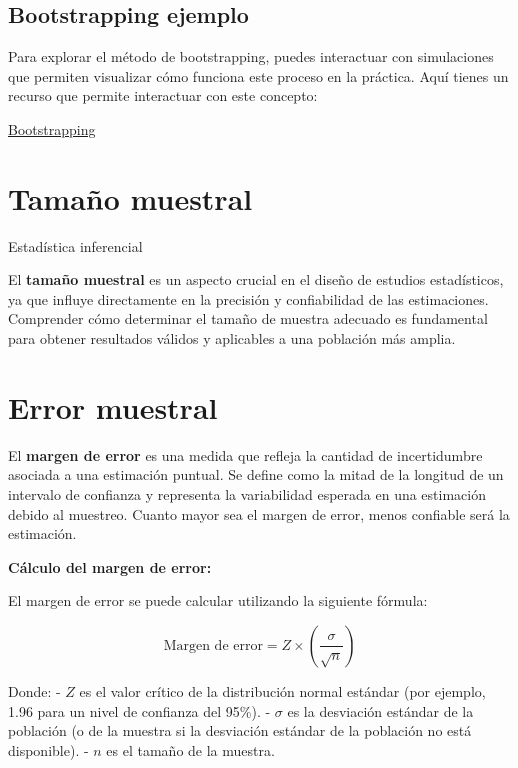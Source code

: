 \documentclass[
  letterpaper,
  DIV=11,
  numbers=noendperiod]{scrreprt}
\begin{document}
\section{Bootstrapping ejemplo}\label{bootstrapping-ejemplo}

Para explorar el método de bootstrapping, puedes interactuar con
simulaciones que permiten visualizar cómo funciona este proceso en la
práctica. Aquí tienes un recurso que permite interactuar con este
concepto:

\href{https://seeing-theory.brown.edu/frequentist-inference/}{Bootstrapping}

\chapter{Tamaño muestral}\label{tamauxf1o-muestral-1}

Estadística inferencial

\hfill\break

El \textbf{tamaño muestral} es un aspecto crucial en el diseño de
estudios estadísticos, ya que influye directamente en la precisión y
confiabilidad de las estimaciones. Comprender cómo determinar el tamaño
de muestra adecuado es fundamental para obtener resultados válidos y
aplicables a una población más amplia.

\chapter{Error muestral}\label{error-muestral-1}

El \textbf{margen de error} es una medida que refleja la cantidad de
incertidumbre asociada a una estimación puntual. Se define como la mitad
de la longitud de un intervalo de confianza y representa la variabilidad
esperada en una estimación debido al muestreo. Cuanto mayor sea el
margen de error, menos confiable será la estimación.

\textbf{Cálculo del margen de error:}

El margen de error se puede calcular utilizando la siguiente fórmula:

\[\text{Margen de error} = Z \times \left(\frac{\sigma}{\sqrt{n}}\right)\]

Donde: - \(Z\) es el valor crítico de la distribución normal estándar
(por ejemplo, 1.96 para un nivel de confianza del 95\%). - \(\sigma\) es
la desviación estándar de la población (o de la muestra si la desviación
estándar de la población no está disponible). - \(n\) es el tamaño de la
muestra.
\end{document}
